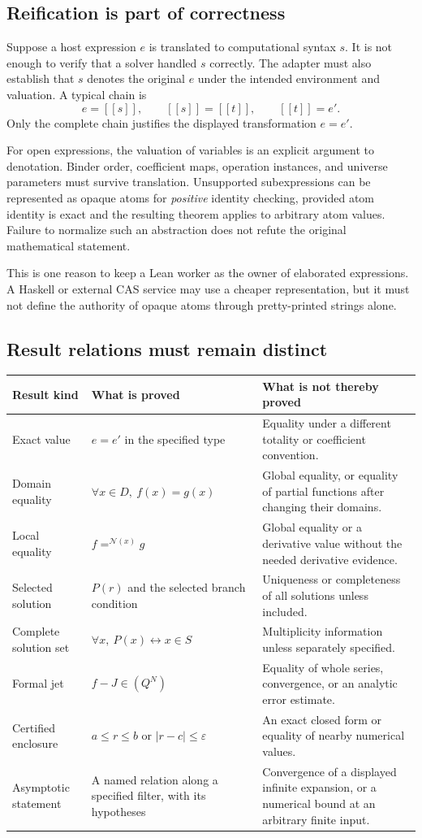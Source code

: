 \documentclass[11pt,letterpaper]{article}
\newcommand{\den}[1]{[\![#1]\!]}
\theoremstyle{definition}
\theoremstyle{remark}
\begin{document}
\subsection{Reification is part of correctness}
Suppose a host expression $e$ is translated to computational syntax $s$. It is
not enough to verify that a solver handled $s$ correctly. The adapter must also
establish that $s$ denotes the original $e$ under the intended environment and
valuation. A typical chain is
\[
 e=\den{s},\qquad \den{s}=\den{t},\qquad \den{t}=e'.
\]
Only the complete chain justifies the displayed transformation $e=e'$.

For open expressions, the valuation of variables is an explicit argument to
denotation. Binder order, coefficient maps, operation instances, and universe
parameters must survive translation. Unsupported subexpressions can be
represented as opaque atoms for \emph{positive} identity checking, provided
atom identity is exact and the resulting theorem applies to arbitrary atom
values. Failure to normalize such an abstraction does not refute the original
mathematical statement.

This is one reason to keep a Lean worker as the owner of elaborated expressions.
A Haskell or external CAS service may use a cheaper representation, but it must
not define the authority of opaque atoms through pretty-printed strings alone.

\subsection{Result relations must remain distinct}
\begin{longtable}{@{}P{.22\textwidth}P{.45\textwidth}P{.25\textwidth}@{}}
\toprule
Result kind & What is proved & What is not thereby proved\\
\midrule
\endhead
Exact value & $e=e'$ in the specified type & Equality under a different totality
or coefficient convention.\\
Domain equality & $\forall x\in D,\ f(x)=g(x)$ & Global equality, or equality of
partial functions after changing their domains.\\
Local equality & $f=^{\mathcal N(x)}g$ & Global equality or a derivative value
without the needed derivative evidence.\\
Selected solution & $P(r)$ and the selected branch condition & Uniqueness or
completeness of all solutions unless included.\\
Complete solution set & $\forall x,\ P(x)\leftrightarrow x\in S$ & Multiplicity
information unless separately specified.\\
Formal jet & $f-J\in(Q^N)$ & Equality of whole series, convergence, or an analytic
error estimate.\\
Certified enclosure & $a\leq r\leq b$ or $|r-c|\leq\varepsilon$ & An exact
closed form or equality of nearby numerical values.\\
Asymptotic statement & A named relation along a specified filter, with its
hypotheses & Convergence of a displayed infinite expansion, or a numerical
bound at an arbitrary finite input.\\
\bottomrule
\end{longtable}
\end{document}

